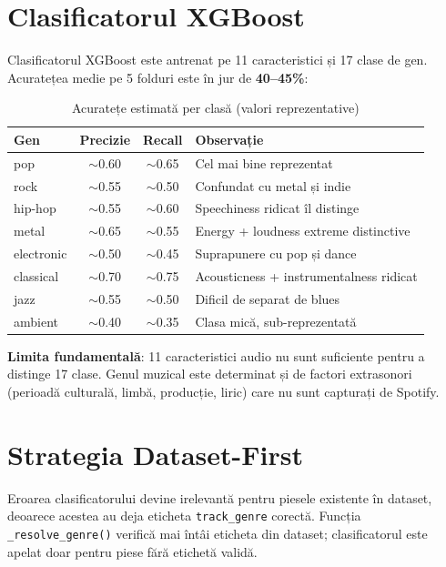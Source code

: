 \documentclass[12pt,a4paper]{report}
\begin{document}
\section{Clasificatorul XGBoost}

Clasificatorul XGBoost este antrenat pe 11 caracteristici și 17 clase de gen.
Acuratețea medie pe 5 folduri este în jur de \textbf{40–45\%}:

\begin{table}[H]
\centering
\renewcommand{\arraystretch}{1.2}
\begin{tabularx}{\textwidth}{@{}lccX@{}}
\toprule
\textbf{Gen} & \textbf{Precizie} & \textbf{Recall} & \textbf{Observație} \\
\midrule
pop         & $\sim$0.60 & $\sim$0.65 & Cel mai bine reprezentat \\
rock        & $\sim$0.55 & $\sim$0.50 & Confundat cu metal și indie \\
hip-hop     & $\sim$0.55 & $\sim$0.60 & Speechiness ridicat îl distinge \\
metal       & $\sim$0.65 & $\sim$0.55 & Energy + loudness extreme distinctive \\
electronic  & $\sim$0.50 & $\sim$0.45 & Suprapunere cu pop și dance \\
classical   & $\sim$0.70 & $\sim$0.75 & Acousticness + instrumentalness ridicat \\
jazz        & $\sim$0.55 & $\sim$0.50 & Dificil de separat de blues \\
ambient     & $\sim$0.40 & $\sim$0.35 & Clasa mică, sub-reprezentată \\
\bottomrule
\end{tabularx}
\caption{Acuratețe estimată per clasă (valori reprezentative)}
\label{tab:accuracy}
\end{table}

\textbf{Limita fundamentală}: 11 caracteristici audio nu sunt suficiente pentru
a distinge 17 clase. Genul muzical este determinat și de factori extrasonori
(perioadă culturală, limbă, producție, liric) care nu sunt capturați de Spotify.

\section{Strategia Dataset-First}

Eroarea clasificatorului devine irelevantă pentru piesele existente în dataset,
deoarece acestea au deja eticheta \texttt{track\_genre} corectă. Funcția
\texttt{\_resolve\_genre()} verifică mai întâi eticheta din dataset; clasificatorul
este apelat doar pentru piese fără etichetă validă.
\end{document}
